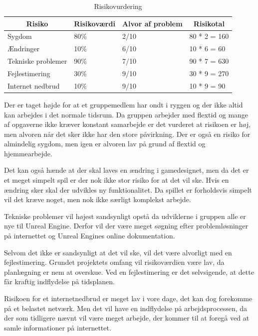 \begin{table}[]
	\centering
	\caption{Risikovurdering}
	\label{tbl:risikoanalyse}
	\begin{tabular}{|l|l|l|l|}
		\hline
		\multicolumn{1}{|c|}{\textbf{Risiko}} & \multicolumn{1}{c|}{\textbf{Risikoværdi}} & \multicolumn{1}{c|}{\textbf{Alvor af problem}} & \multicolumn{1}{c|}{\textbf{Risikotal}} \\ \hline
		Sygdom & 80\% & 2/10 & 80 * 2 = 160 \\ \hline
		Ændringer & 10\% & 6/10 & 10 * 6 = 60 \\ \hline
		Tekniske problemer & 90\% & 7/10 & 90 * 7 = 630 \\ \hline
		Fejlestimering & 30\% & 9/10 & 30 * 9 = 270 \\ \hline
		Internet nedbrud & 10\% & 9/10 & 10 * 9 = 90 \\ \hline
	\end{tabular}
\end{table}

Der er taget højde for at et gruppemedlem har ondt i ryggen og der ikke altid kan arbejdes i det normale tidsrum. Da gruppen arbejder med flextid og mange af opgaverne ikke kræver konstant samarbejde er det vurderet at risikoen er høj, men alvoren når det sker ikke har den store påvirkning. Der er også en risiko for almindelig sygdom, men igen er alvoren lav på grund af flextid og hjemmearbejde.

Det kan også hænde at der skal laves en ændring i gamedesignet, men da det er et meget simpelt spil er der nok ikke stor risiko for at det vil ske. Hvis en ændring sker skal der udvikles ny funktionalitet. Da spillet er forholdsvis simpelt vil det kræve noget, men nok ikke særligt komplekst arbejde.

Tekniske problemer vil højest sandsynligt opstå da udviklerne i gruppen alle er nye til Unreal Engine. Derfor vil der være meget søgning efter problemløsninger på internettet og Unreal Engines online dokumentation.

Selvom det ikke er sandsynligt at det vil ske, vil det være alvorligt med en fejlestimering. Grundet projektets omfang vil risikoværdien være lav, da planlægning er nem at overskue. Ved en fejlestimering er det selvsigende, at dette får kraftig indflydelse på tidsplanen.

Risikoen for et internetnedbrud er meget lav i vore dage, det kan dog forekomme på et belastet netværk. Men det vil have en indflydelse på arbejdsprocessen, da der som tidligere nævnt vil være meget arbejde, der kommer til at foregå ved at samle informationer på internettet.
 
